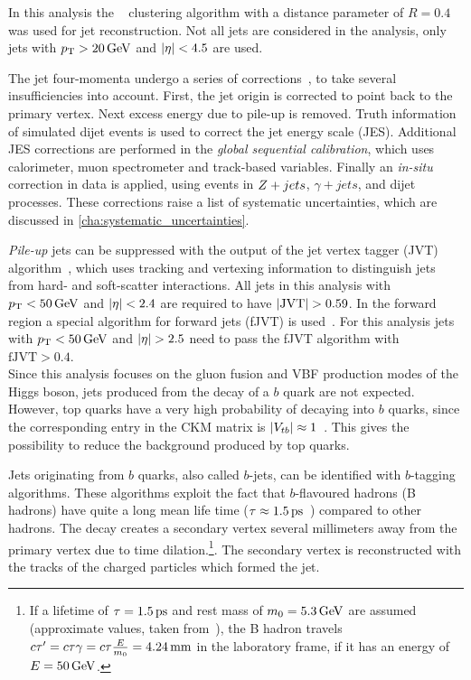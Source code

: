 In this analysis the \antikt{}~\cite{Cacciari:2008gp,Cacciari:2005hq} clustering algorithm with a distance parameter
of $R = 0.4$ was used for jet reconstruction.
Not all jets are considered in the analysis, only jets with $\pt > \unit[20]{GeV}$ and $\left|\eta\right| < 4.5$ are used.

The jet four-momenta undergo a series of corrections~\cite{PERF-2016-04}, to take several insufficiencies into account.
First, the jet origin is corrected to point back to the primary vertex. Next excess energy due to pile-up is removed.
Truth information of simulated dijet events is used to correct the jet energy scale (JES).
Additional JES corrections are performed in the \emph{global sequential calibration}, which uses calorimeter, muon
spectrometer and track-based variables. Finally an \emph{in-situ} correction in data is applied, using events
in $Z+jets$, $\gamma + jets$, and dijet processes.
These corrections raise a list of systematic uncertainties, which are discussed in \cref{cha:systematic_uncertainties}.

\emph{Pile-up} jets can be suppressed with the output of the jet vertex tagger (JVT) algorithm~\cite{PERF-2014-03}, which
uses tracking and vertexing information to distinguish jets from hard- and soft-scatter interactions.
All jets in this analysis with $\pt < \unit[50]{GeV}$ and $\left|\eta\right| < 2.4$ are required to have $\left|\text{JVT}\right| > 0.59$.
In the forward region a special algorithm for forward jets (fJVT) is used~\cite{ATL-PHYS-PUB-2015-034}.
For this analysis jets with $\pt < \unit[50]{GeV}$ and $\left|\eta\right| > 2.5$ need to pass the fJVT algorithm with
$\text{fJVT} > 0.4$.
\\[\baselineskip]
Since this analysis focuses on the gluon fusion and VBF production modes of the Higgs boson, jets produced from
the decay of a $b$ quark are not expected. However, top quarks have a very high probability of decaying into $b$ quarks,
since the corresponding entry in the CKM matrix is $\left|V_{tb}\right| \approx 1$~\cite{PDG}.
This gives the possibility to reduce the background produced by top quarks.

Jets originating from $b$ quarks, also called $b$-jets, can be identified with $b$-tagging algorithms.
These algorithms exploit the fact that $b$-flavoured hadrons (B hadrons) have quite a long mean life time
($\tau \approx \unit[1.5]{ps}$~\cite{PDG}) compared to other hadrons.
The decay creates a secondary vertex several millimeters away from the primary vertex due to time
dilation.\footnote{If a lifetime of $\tau = \unit[1.5]{ps}$ and rest mass of $m_0 = \unit[5.3]{GeV}$ are assumed (approximate values, taken from~\cite{PDG}),
the B hadron travels $c\tau' = c \tau \gamma = c \tau \frac{E}{m_0} = \unit[4.24]{mm}$ in the laboratory frame, if it has an energy of $E = \unit[50]{GeV}$.}.
The secondary vertex is reconstructed with the tracks of the charged particles which formed the jet.

